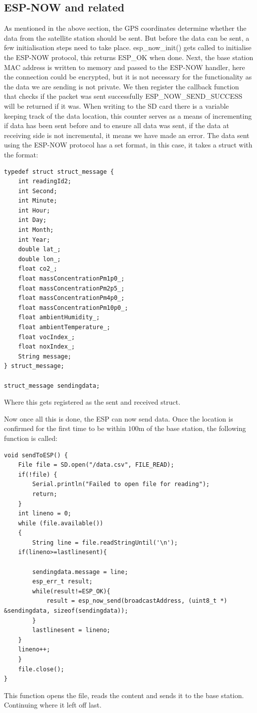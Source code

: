 \subsection{ESP-NOW and related}
As mentioned in the above section, the GPS coordinates determine whether the data from the satellite station should be sent. But before the data can be sent, a few initialisation steps need to take place.
esp\_now\_init() gets called to initialise the ESP-NOW protocol, this returns ESP\_OK when done. Next, the base station MAC address is written to memory and passed to the ESP-NOW handler, here the connection could be encrypted, but it is not necessary for the functionality as the data we are sending is not private. We then register the callback function that checks if the packet was sent successfully ESP\_NOW\_SEND\_SUCCESS will be returned if it was. When writing to the SD card there is a variable keeping track of the data location, this counter serves as a means of incrementing if data has been sent before and to ensure all data was sent, if the data at receiving side is not incremental, it means we have made an error. The data sent using the ESP-NOW protocol has a set format, in this case, it takes a struct with the format:


\begin{lstlisting}
typedef struct struct_message {
	int readingId2;
	int Second;
	int Minute;
	int Hour;
	int Day;
	int Month;
	int Year;
	double lat_;
	double lon_;
	float co2_;
	float massConcentrationPm1p0_;
	float massConcentrationPm2p5_;
	float massConcentrationPm4p0_;
	float massConcentrationPm10p0_;
	float ambientHumidity_;
	float ambientTemperature_;
	float vocIndex_;
	float noxIndex_;  
	String message;
} struct_message;

struct_message sendingdata;
\end{lstlisting}
\noindent
Where this gets registered as the sent and received struct. 

\noindent
Now once all this is done, the ESP can now send data. Once the location is confirmed for the first time to be within $100 \si{\meter}$ of the base station, the following function is called:
\begin{lstlisting}
void sendToESP() {
	File file = SD.open("/data.csv", FILE_READ);
	if(!file) {
		Serial.println("Failed to open file for reading");
		return;
	}
	int lineno = 0;
	while (file.available())
	{
		String line = file.readStringUntil('\n');
	if(lineno>=lastlinesent){
		
		sendingdata.message = line;
		esp_err_t result;
		while(result!=ESP_OK){
			result = esp_now_send(broadcastAddress, (uint8_t *) &sendingdata, sizeof(sendingdata));
		}
		lastlinesent = lineno;
	}
	lineno++;
	}
	file.close();
}
\end{lstlisting}
This function opens the file, reads the content and sends it to the base station. Continuing where it left off last. 




